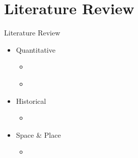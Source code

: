 \documentclass{beamer}
\begin{document}
\section{Literature Review}
\begin{frame}{Literature Review}
	\begin{itemize}
		\item Quantitative
		\begin{itemize}
			\item \textcite{feldmanPoliceRelatedDeathsNeighborhood2019}
			\item \textcite{feldmanPoliceKillingsUS2020} \pause
		\end{itemize}
		\item Historical
		\begin{itemize}
			\item \citeauthor{johnsonAfterwordBaltimorePolicing2016} \parencites*{
			johnsonAfterwordBaltimorePolicing2016, 
			johnsonTrumpismPolicingProblem2019, 
			johnsonBlackLivesMatter2023} \pause
		\end{itemize}
		\item Space \& Place
		\begin{itemize}
			\item \textcite{wacquantClassRaceHyperincarceration2010}
		\end{itemize}
	\end{itemize}
\end{frame}

\end{document}
